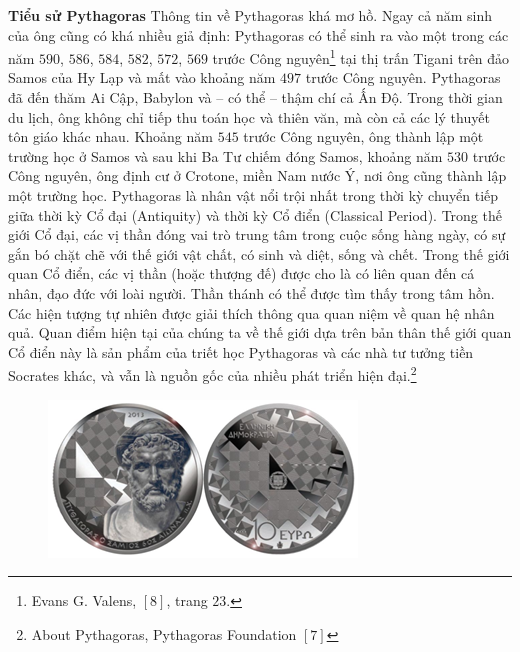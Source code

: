 \begin{multicols}{2}
\begin{figure}[H]
	\end{figure}
	\textbf{\color{lichsutoanhoc}Tiểu sử Pythagoras} 
	\vskip 0.1cm
	Thông tin về Pythagoras khá mơ hồ. Ngay cả năm sinh của ông cũng có khá nhiều giả định: Pythagoras có thể sinh ra vào một trong các năm $590$, $586$, $584$, $582$, $572$, $569$ trước Công nguyên\footnote[4]{\color{lichsutoanhoc}Evans G. Valens, $[8]$, trang $23$.}  tại thị trấn Tigani trên đảo Samos của Hy Lạp và mất vào khoảng năm $497$ trước Công nguyên.
	\vskip 0.05cm
	Pythagoras đã đến thăm Ai Cập, Babylon và -- có thể -- thậm chí cả Ấn Độ. Trong thời gian du lịch, ông không chỉ tiếp thu toán học và thiên văn, mà còn cả các lý thuyết tôn giáo khác nhau. 
	\vskip 0.1cm
	Khoảng năm $545$ trước Công nguyên, ông thành lập một trường học ở Samos và sau khi Ba Tư chiếm đóng Samos, khoảng năm $530$ trước Công nguyên, ông định cư ở Crotone, miền Nam nước Ý, nơi ông cũng thành lập một trường học.
	\vskip 0.1cm
	Pythagoras là nhân vật nổi trội nhất trong thời kỳ chuyển tiếp giữa thời kỳ Cổ đại (Antiquity) và thời kỳ Cổ điển (Classical Period). Trong thế giới Cổ đại, các vị thần đóng vai trò trung tâm trong cuộc sống hàng ngày, có sự gắn bó chặt chẽ với thế giới vật chất, có sinh và diệt, sống và chết. Trong thế giới quan Cổ điển, các vị thần (hoặc thượng đế) được cho là có liên quan đến cá nhân, đạo đức với loài người. Thần thánh có thể được tìm thấy trong tâm hồn. Các hiện tượng tự nhiên được giải thích thông qua quan niệm về quan hệ nhân quả. Quan điểm hiện tại của chúng ta về thế giới dựa trên bản thân thế giới quan Cổ điển này là sản phẩm của triết học Pythagoras và các nhà tư tưởng tiền Socrates khác, và vẫn là nguồn gốc của nhiều phát triển hiện đại.\footnote[5]{\color{lichsutoanhoc}About Pythagoras, Pythagoras Foundation $[7]$}
	\begin{figure}[H]
		\vspace*{-5pt}
		\centering
		\captionsetup{labelformat= empty, justification=centering}
		\includegraphics[width= 1\linewidth]{2}

\end{figure}
\end{multicols}
